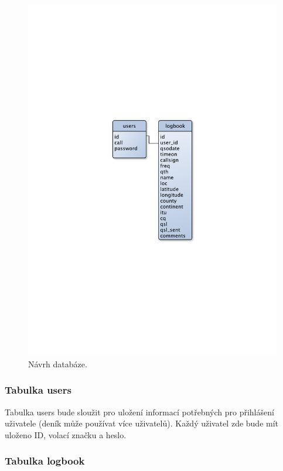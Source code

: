 \begin{figure}[h]
\centering
\includegraphics[trim=9cm 9cm 9cm 9cm, scale=0.7]{fig/navrh_databaze}
\caption{Návrh databáze.}
\label{fig:databaze}
\end{figure}

\subsubsection{Tabulka users}

Tabulka users bude sloužit pro uložení informací potřebných pro přihlášení uživatele (deník může
používat více uživatelů). Každý uživatel zde bude mít uloženo ID, volací značku a
heslo.

\subsubsection{Tabulka logbook}

